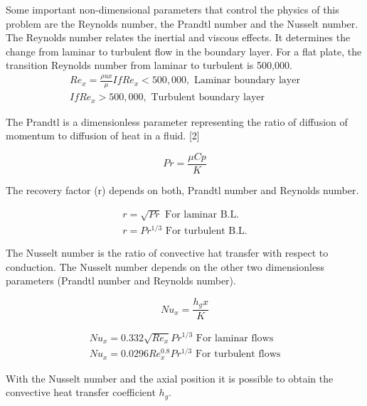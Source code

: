 Some important non-dimensional parameters that control the physics of this problem are the Reynolds number, the Prandtl number and the Nusselt number.
The Reynolds number relates the inertial and viscous effects. It determines the change from laminar to turbulent flow in the boundary layer. For a flat plate, the transition Reynolds number from laminar to turbulent is 500,000.
\begin{equation}
\begin{split}
Re_x=\frac{\rho u x}{\mu}	
If   Re_x<500,000, \text{  Laminar boundary layer} \\
	If   Re_x>500,000, \text{  Turbulent boundary layer}
\end{split}
\end{equation}

The Prandtl is a dimensionless parameter representing the ratio of diffusion of momentum to diffusion of heat in a fluid. [2]

\begin{equation}
Pr=\frac{\mu Cp}{K}
\end{equation}

The recovery factor (r) depends on both, Prandtl number and Reynolds number.

\begin{equation}
\begin{split}
r=\sqrt{Pr} \text{  For laminar B.L.}	\\
r=Pr^{1/3} \text{  For turbulent B.L.}
\end{split}
\end{equation}

The Nusselt number is the ratio of convective hat transfer with respect to conduction. The Nusselt number depends on the other two dimensionless parameters (Prandtl number and Reynolds number).

\begin{equation}
Nu_x=\frac{h_g x}{K}
\end{equation}

\begin{equation}
\begin{split}
Nu_x=0.332\sqrt{Re_x} Pr^{1/3}	\text{  For laminar flows} \\
Nu_x=0.0296Re_x^{0.8} Pr^{1/3}	\text{  For turbulent flows}
\end{split}
\end{equation}

With the Nusselt number and the axial position it is possible to obtain the convective heat transfer coefficient $h_g$.

